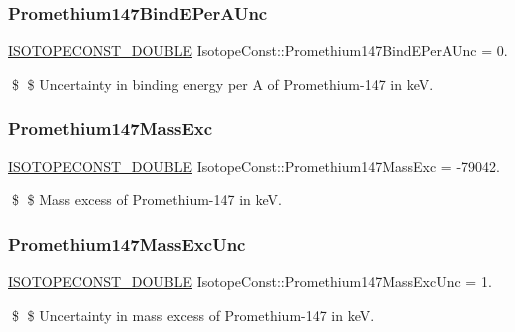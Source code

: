 \subsubsection{\texorpdfstring{Promethium147\+Bind\+E\+Per\+A\+Unc}{Promethium147BindEPerAUnc}}
{\footnotesize\ttfamily \mbox{\hyperlink{group___isotope_const-_macros_ga8f45a7272ce02c0b4c65c44636ed719a}{I\+S\+O\+T\+O\+P\+E\+C\+O\+N\+S\+T\+\_\+\+D\+O\+U\+B\+LE}} Isotope\+Const\+::\+Promethium147\+Bind\+E\+Per\+A\+Unc = 0.}

\$ \$ Uncertainty in binding energy per A of Promethium-\/147 in keV. \mbox{\label{group___isotope_const-_promethium-_pm147_gaee73879f316f45219acd93988c3129dd}} 
\subsubsection{\texorpdfstring{Promethium147\+Mass\+Exc}{Promethium147MassExc}}
{\footnotesize\ttfamily \mbox{\hyperlink{group___isotope_const-_macros_ga8f45a7272ce02c0b4c65c44636ed719a}{I\+S\+O\+T\+O\+P\+E\+C\+O\+N\+S\+T\+\_\+\+D\+O\+U\+B\+LE}} Isotope\+Const\+::\+Promethium147\+Mass\+Exc = -\/79042.}

\$ \$ Mass excess of Promethium-\/147 in keV. \mbox{\label{group___isotope_const-_promethium-_pm147_gaecf278f049db05f8abd47b911e67454f}} 
\subsubsection{\texorpdfstring{Promethium147\+Mass\+Exc\+Unc}{Promethium147MassExcUnc}}
{\footnotesize\ttfamily \mbox{\hyperlink{group___isotope_const-_macros_ga8f45a7272ce02c0b4c65c44636ed719a}{I\+S\+O\+T\+O\+P\+E\+C\+O\+N\+S\+T\+\_\+\+D\+O\+U\+B\+LE}} Isotope\+Const\+::\+Promethium147\+Mass\+Exc\+Unc = 1.}

\$ \$ Uncertainty in mass excess of Promethium-\/147 in keV. \mbox{\label{group___isotope_const-_promethium-_pm147_ga577f1bfdcf3118f2f92a69840d581455}} 
